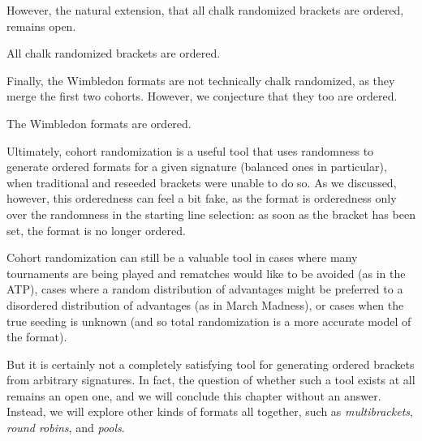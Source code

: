 {    

    However, the natural extension, that all chalk randomized brackets are ordered, remains open.

    \begin{conj}{}{}
        All chalk randomized brackets are ordered.
    \end{conj}

    Finally, the Wimbledon formats are not technically chalk randomized, as they merge the first two cohorts. However, we conjecture that they too are ordered.

    \begin{conj}{}{}
        The Wimbledon formats are ordered.
    \end{conj}

    Ultimately, cohort randomization is a useful tool that uses randomness to generate ordered formats for a given signature (balanced ones in particular), when traditional and reseeded brackets were unable to do so. As we discussed, however, this orderedness can feel a bit fake, as the format is orderedness only over the randomness in the starting line selection: as soon as the bracket has been set, the format is no longer ordered.

    Cohort randomization can still be a valuable tool in cases where many tournaments are being played and rematches would like to be avoided (as in the ATP), cases where a random distribution of advantages might be preferred to a disordered distribution of advantages (as in March Madness), or cases when the true seeding is unknown (and so total randomization is a more accurate model of the format).
    
    But it is certainly not a completely satisfying tool for generating ordered brackets from arbitrary signatures. In fact, the question of whether such a tool exists at all remains an open one, and we will conclude this chapter without an answer. Instead, we will explore other kinds of formats all together, such as \textit{multibrackets}, \textit{round robins}, and \textit{pools}.
    




    
    
}